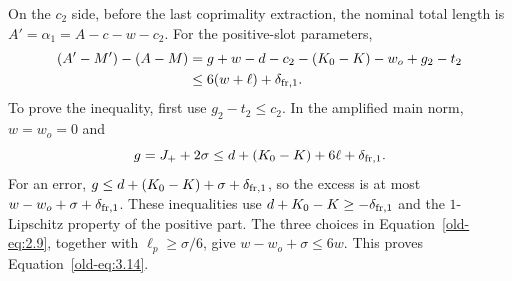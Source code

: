 \documentclass[11pt,a4paper]{article}
\numberwithin{equation}{section}
\numberwithin{figure}{section}
\theoremstyle{definition}
\theoremstyle{remark}
\begin{document}
On the \(c_2\) side, before the last coprimality extraction, the
nominal total length is \(A'=\alpha_1=A-c-w-c_2\).  For the positive-slot parameters,
\begin{equation}
 \begin{split}
 (A'-M')-(A-M)
 &=g+w-d-c_2-(K_0-K)-w_o+g_2-t_2\\
 &\le6(w+\ell)+\delta_{{\rm fr},1}.
 \end{split}
 \label{old-eq:3.14}
\end{equation}
To prove the inequality, first use \(g_2-t_2\le c_2\).
In the amplified main norm, \(w=w_o=0\) and
\[
 g=J_++2\sigma
 \le d+(K_0-K)+6\ell+\delta_{{\rm fr},1}.
\]
For an error,
\(g\le d+(K_0-K)+\sigma+\delta_{{\rm fr},1}\), so the excess is at most
\(w-w_o+\sigma+\delta_{{\rm fr},1}\).  These inequalities use
\(d+K_0-K\ge-\delta_{{\rm fr},1}\) and the
\(1\)-Lipschitz property of the positive part.  The three choices in
Equation~\eqref{old-eq:2.9}, together with
\(\ell_p\ge\sigma/6\), give
\(w-w_o+\sigma\le6w\).  This proves
Equation~\eqref{old-eq:3.14}.
\end{document}
